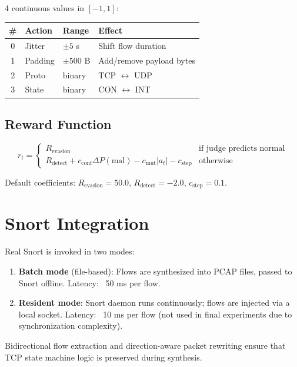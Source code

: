 \documentclass[12pt,a4paper]{report}
\begin{document}
4 continuous values in $[-1, 1]$:

\begin{table}[h]
\centering
\begin{tabular}{c|l|l|l}
\# & Action & Range & Effect \\
\hline
0 & Jitter & $\pm 5$ s & Shift flow duration \\
1 & Padding & $\pm 500$ B & Add/remove payload bytes \\
2 & Proto & binary & TCP $\leftrightarrow$ UDP \\
3 & State & binary & CON $\leftrightarrow$ INT \\
\end{tabular}
\end{table}

\subsection{Reward Function}

\begin{equation}
r_t = \begin{cases}
R_{\text{evasion}} & \text{if judge predicts normal} \\
R_{\text{detect}} + c_{\text{conf}} \Delta P(\text{mal}) - c_{\text{mut}} |a_t| - c_{\text{step}} & \text{otherwise}
\end{cases}
\end{equation}

Default coefficients: $R_{\text{evasion}} = 50.0$, $R_{\text{detect}} = -2.0$, $c_{\text{step}} = 0.1$.

\section{Snort Integration}

Real Snort is invoked in two modes:

\begin{enumerate}
  \item \textbf{Batch mode} (file-based): Flows are synthesized into PCAP files, passed to Snort offline. Latency: ~50 ms per flow.
  
  \item \textbf{Resident mode}: Snort daemon runs continuously; flows are injected via a local socket. Latency: ~10 ms per flow (not used in final experiments due to synchronization complexity).
\end{enumerate}

Bidirectional flow extraction and direction-aware packet rewriting ensure that TCP state machine logic is preserved during synthesis.
\end{document}

